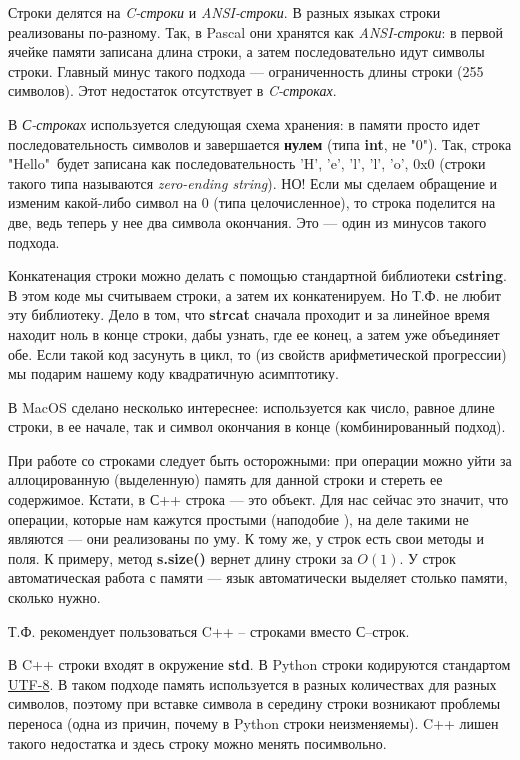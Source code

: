\begin{lecture}[\lectureSubject]
	\begin{lecSection}
		Строки делятся на \textit{C-строки} и \textit{ANSI-строки}. В разных языках строки реализованы по-разному. Так, в Pascal они хранятся как \textit{ANSI-строки}: в первой ячейке памяти записана длина строки, а затем последовательно идут символы строки. Главный минус такого подхода --- ограниченность длины строки (255 символов). Этот недостаток отсутствует в \textit{C-строках}.
		
		В \textit{С-строках} используется следующая схема хранения: в памяти просто идет последовательность символов и завершается \textbf{нулем} (типа \textbf{int}, не "0"). Так, строка "Hello"\, будет записана как последовательность 'H', 'e', 'l', 'l', 'o', 0x0 (строки такого типа называются \textit{zero-ending string}). НО! Если мы сделаем обращение и изменим какой-либо символ на 0 (типа целочисленное), то строка поделится на две, ведь теперь у нее два символа окончания. Это --- один из минусов такого подхода.
	\end{lecSection}
	\begin{lecSection}
		Конкатенация строки можно делать с помощью стандартной библиотеки \textbf{cstring}.
		В этом коде мы считываем строки, а затем их конкатенируем. Но Т.Ф. не любит эту библиотеку. Дело в том, что \textbf{strcat} сначала проходит и за линейное время находит ноль в конце строки, дабы узнать, где ее конец, а затем уже объединяет обе. Если такой код засунуть в цикл, то (из свойств арифметической прогрессии) мы подарим нашему коду квадратичную асимптотику.
		
		В MacOS сделано несколько интереснее: используется как число, равное длине строки, в ее начале, так и символ окончания в конце (комбинированный подход).
		
		При работе со строками следует быть осторожными: при операции \fbox{+=} можно уйти за аллоцированную (выделенную) память для данной строки и стереть ее содержимое. Кстати, в С++ строка --- это объект. Для нас сейчас это значит, что операции, которые нам кажутся простыми (наподобие \fbox{+=}), на деле такими не являются --- они реализованы по уму. К тому же, у строк есть свои методы и поля. К примеру, метод \textbf{s.size()} вернет длину строки за $O(1)$. У строк автоматическая работа с памяти --- язык автоматически выделяет столько памяти, сколько нужно.
		
		Т.Ф. рекомендует пользоваться C++ -- строками вместо С--строк.
	\end{lecSection}
	\begin{lecSection}[C++\, -- строки]
		В C++ строки входят в окружение \textbf{std}.
		В Python строки кодируются стандартом \underline{UTF-8}. В таком подходе память используется в разных количествах для разных символов, поэтому при вставке символа в середину строки возникают проблемы переноса (одна из причин, почему в Python строки неизменяемы). C++ лишен такого недостатка и здесь строку можно менять посимвольно.
		

\end{lecSection}
\end{lecture}
